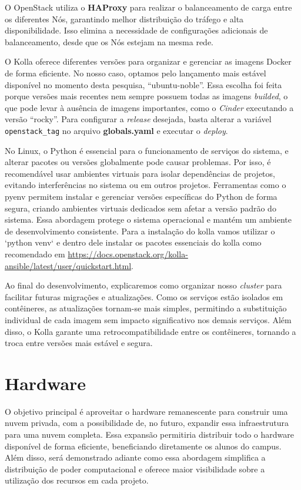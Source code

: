 O OpenStack utiliza o \textbf{HAProxy} para realizar o balanceamento de carga entre os diferentes Nós, garantindo melhor distribuição do tráfego e alta disponibilidade. Isso elimina a necessidade de configurações adicionais de balanceamento, desde que os Nós estejam na mesma rede.

O Kolla oferece diferentes versões para organizar e gerenciar as imagens Docker de forma eficiente. No nosso caso, optamos pelo lançamento mais estável disponível no momento desta pesquisa, ``ubuntu-noble''. Essa escolha foi feita porque versões mais recentes nem sempre possuem todas as imagens \textit{builded}, o que pode levar à ausência de imagens importantes, como o \textit{Cinder} executando a versão ``rocky''. Para configurar a \textit{release} desejada, basta alterar a variável \texttt{openstack\_tag} no arquivo \textbf{globals.yaml} e executar o \textit{deploy}.

No Linux, o Python é essencial para o funcionamento de serviços do sistema, e alterar pacotes ou versões globalmente pode causar problemas. Por isso, é recomendável usar ambientes virtuais para isolar dependências de projetos, evitando interferências no sistema ou em outros projetos. Ferramentas como o pyenv permitem instalar e gerenciar versões específicas do Python de forma segura, criando ambientes virtuais dedicados sem afetar a versão padrão do sistema. Essa abordagem protege o sistema operacional e mantém um ambiente de desenvolvimento consistente. Para a instalação do kolla vamos utilizar o `python venv` e dentro dele instalar os pacotes essenciais do kolla como recomendado em \url{https://docs.openstack.org/kolla-ansible/latest/user/quickstart.html}.

Ao final do desenvolvimento, explicaremos como organizar nosso \textit{cluster} para facilitar futuras migrações e atualizações. Como os serviços estão isolados em contêineres, as atualizações tornam-se mais simples, permitindo a substituição individual de cada imagem sem impacto significativo nos demais serviços. Além disso, o Kolla garante uma retrocompatibilidade entre os contêineres, tornando a troca entre versões mais estável e segura.


\section{Hardware}

O objetivo principal é aproveitar o hardware remanescente para construir uma nuvem privada, com a possibilidade de, no futuro, expandir essa infraestrutura para uma nuvem completa. Essa expansão permitiria distribuir todo o hardware disponível de forma eficiente, beneficiando diretamente os alunos do campus. Além disso, será demonstrado adiante como essa abordagem simplifica a distribuição de poder computacional e oferece maior visibilidade sobre a utilização dos recursos em cada projeto.

